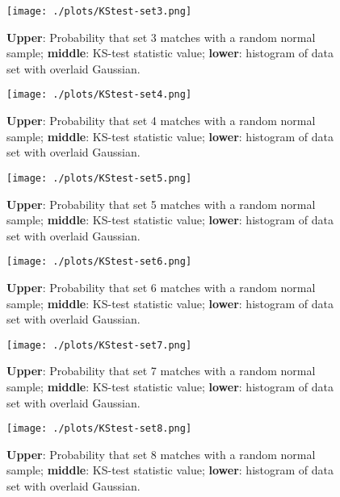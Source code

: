 \documentclass{article}
\begin{document}
\begin{figure}[!h]
\centering
\begin{minipage}[t]{7.6cm}
    \centering
    \texttt{[image: ./plots/KStest-set3.png]}
    \caption{\textbf{Upper}: Probability that set 3 matches with a random normal sample; \textbf{middle}: KS-test statistic value; \textbf{lower}: histogram of data set with overlaid Gaussian.}
    \label{fig:KS-3}
\end{minipage}%
\qquad
\begin{minipage}[t]{7.6cm}
    \centering
    \texttt{[image: ./plots/KStest-set4.png]}
    \caption{\textbf{Upper}: Probability that set 4 matches with a random normal sample; \textbf{middle}: KS-test statistic value; \textbf{lower}: histogram of data set with overlaid Gaussian.}
    \label{fig:KS-4}
\end{minipage}%
\end{figure}

\begin{figure}[!h]
\centering
\begin{minipage}[t]{7.6cm}
    \centering
    \texttt{[image: ./plots/KStest-set5.png]}
    \caption{\textbf{Upper}: Probability that set 5 matches with a random normal sample; \textbf{middle}: KS-test statistic value; \textbf{lower}: histogram of data set with overlaid Gaussian.}
    \label{fig:KS-5}
\end{minipage}%
\qquad
\begin{minipage}[t]{7.6cm}
    \centering
    \texttt{[image: ./plots/KStest-set6.png]}
    \caption{\textbf{Upper}: Probability that set 6 matches with a random normal sample; \textbf{middle}: KS-test statistic value; \textbf{lower}: histogram of data set with overlaid Gaussian.}
    \label{fig:KS-6}
\end{minipage}%
\end{figure}

\begin{figure}[!h]
\centering
\begin{minipage}[t]{7.6cm}
    \centering
    \texttt{[image: ./plots/KStest-set7.png]}
    \caption{\textbf{Upper}: Probability that set 7 matches with a random normal sample; \textbf{middle}: KS-test statistic value; \textbf{lower}: histogram of data set with overlaid Gaussian.}
    \label{fig:KS-7}
\end{minipage}%
\qquad
\begin{minipage}[t]{7.6cm}
    \centering
    \texttt{[image: ./plots/KStest-set8.png]}
    \caption{\textbf{Upper}: Probability that set 8 matches with a random normal sample; \textbf{middle}: KS-test statistic value; \textbf{lower}: histogram of data set with overlaid Gaussian.}
    \label{fig:KS-8}
\end{minipage}%
\end{figure}
\end{document}
